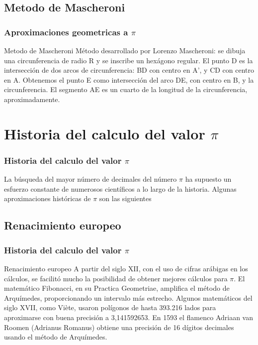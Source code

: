 \documentclass{beamer}
\begin{document}
\subsection {Metodo de Mascheroni}
\begin{frame}
\frametitle{Aproximaciones geometricas a $\pi$}
\begin{block}{Metodo de Mascheroni}
Método desarrollado por Lorenzo Mascheroni: se dibuja una circunferencia de radio R y se inscribe un hexágono regular. El punto D es la intersección de dos arcos de circunferencia: BD con centro en A', y CD con centro en A. Obtenemos el punto E como intersección del arco DE, con centro en B, y la circunferencia. El segmento AE es un cuarto de la longitud de la circunferencia, aproximadamente. \cite{Wpress}
\end{block}
\end{frame}

\section {Historia del calculo del valor $\pi$}
\begin{frame}
\frametitle{Historia del calculo del valor $\pi$}
La búsqueda del mayor número de decimales del número $\pi$ ha supuesto un esfuerzo constante de numerosos científicos a lo largo de la historia. Algunas aproximaciones históricas de $\pi$ son las siguientes \cite{Wiki}

\end{frame}
\subsection{Renacimiento europeo}
\begin{frame}
\frametitle{Historia del calculo del valor $\pi$}
\begin{block}{Renacimiento europeo}
A partir del siglo XII, con el uso de cifras arábigas en los cálculos, se facilitó mucho la posibilidad de obtener mejores cálculos para $\pi$. El matemático Fibonacci, en su Practica Geometriae, amplifica el método de Arquímedes, proporcionando un intervalo más estrecho. Algunos matemáticos del siglo XVII, como Viète, usaron polígonos de hasta 393.216 lados para aproximarse con buena precisión a 3,141592653. En 1593 el flamenco Adriaan van Roomen (Adrianus Romanus) obtiene una precisión de 16 dígitos decimales usando el método de Arquímedes.
\end{block}
\end{frame}
\end{document}
